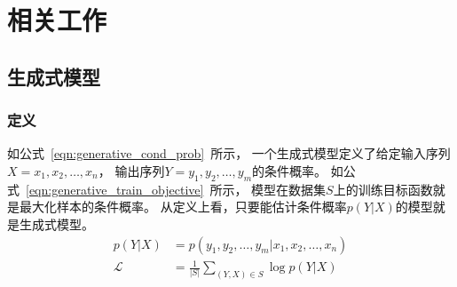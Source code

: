 % 
% 
% 
% 

\chapter{相关工作}\label{ch:related_work}
\section{生成式模型}\label{sec:generative_model}

\subsection{定义}\label{subsec:definition}
如公式~\ref{eqn:generative_cond_prob}~所示，
一个生成式模型定义了给定输入序列$X = x_1, x_2, \dots, x_n$，
输出序列$Y = y_1, y_2, \dots, y_m$的条件概率。
如公式~\ref{eqn:generative_train_objective}~所示，
模型在数据集$S$上的训练目标函数就是最大化样本的条件概率。
从定义上看，只要能估计条件概率$p(Y|X)$的模型就是生成式模型。
\begin{align}
    p(Y|X) &= p(y_1, y_2, \dots, y_m|x_1, x_2, \dots, x_n)
    \label{eqn:generative_cond_prob} \\
    \mathcal{L} &= \frac{1}{|S|} \sum_{(Y, X) \in S} \log p(Y|X)
    \label{eqn:generative_train_objective}
\end{align}

